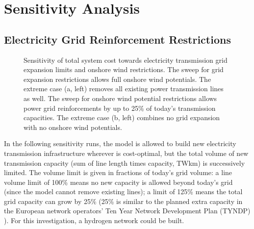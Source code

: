 \section{Sensitivity Analysis}
\label{sec:si:sensitivity}

\subsection{Electricity Grid Reinforcement Restrictions}
\label{sec:si:lv}

\begin{figure}
    \centering
    \caption{Sensitivity of total system cost towards electricity transmission grid expansion limits and onshore wind restrictions.
    The sweep for grid expansion restrictions allows full onshore wind potentials.
    The extreme case (a, left) removes all existing power transmission lines as well.
    The sweep for onshore wind potential restrictions allows power grid reinforcements by up to 25\% of today's transmission capacities.
    The extreme case (b, left) combines no grid expansion with no onshore wind potentials.}

    \label{fig:lv-onw-restriction}
\end{figure}

In the following sensitivity runs, the model is allowed to build new electricity
transmission infrastructure wherever is cost-optimal, but the total volume of
new transmission capacity (sum of line length times capacity, TWkm) is
successively limited. The volume limit is given in fractions of today's grid
volume: a line volume limit of 100\% means no new capacity is allowed beyond
today's grid (since the model cannot remove existing lines); a limit of 125\%
means the total grid capacity can grow by 25\% (25\% is similar to the planned
extra capacity in the European network operators' Ten Year Network Development
Plan (TYNDP) ). For this investigation, a hydrogen network
could be built.


